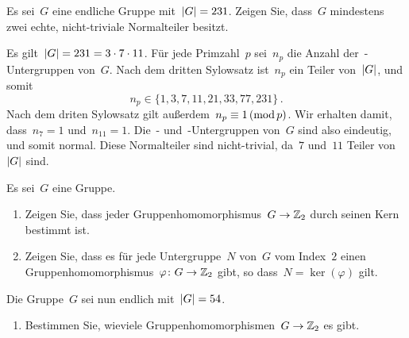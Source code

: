 \documentclass{scrartcl}
\begin{document}
\begin{exercise}
  Es sei~$G$ eine endliche Gruppe mit~$\lvert G\rvert = 231$.
  Zeigen Sie, dass~$G$ mindestens zwei echte, nicht-triviale Normalteiler besitzt.
\end{exercise}


\begin{solution}
  Es gilt~$\lvert G\rvert = 231 = 3 \cdot 7 \cdot 11$.
  Für jede Primzahl~$p$ sei~$n_p$ die Anzahl der~-Untergruppen von~$G$.
  Nach dem dritten Sylowsatz ist~$n_p$ ein Teiler von~$\lvert G\rvert$, und somit
  \[
    n_p \in \{ 1, 3, 7, 11, 21, 33, 77, 231 \} \,.
  \]
  Nach dem driten Sylowsatz gilt außerdem~$n_p \equiv 1 \,(\operatorname{mod} p)$.
  Wir erhalten damit, dass~$n_7 = 1$ und~$n_{11} = 1$.
  Die~- und~-Untergruppen von~$G$ sind also eindeutig, und somit normal.
  Diese Normalteiler sind nicht-trivial, da~$7$ und~$11$ Teiler von~$\lvert G\rvert$ sind.
\end{solution}

\begin{exercise}[subtitle = {Erstklausur 18/19}]
  Es sei~$G$ eine Gruppe.
  \begin{enumerate}
    \item
      Zeigen Sie, dass jeder Gruppenhomomorphismus~$G \to \Integer_2$ durch seinen Kern bestimmt ist.
    \item
      Zeigen Sie, dass es für jede Untergruppe~$N$ von~$G$ vom Index~$2$ einen Gruppenhomomorphismus~$\varphi \colon G \to \Integer_2$ gibt, so dass~$N = \ker(\varphi)$ gilt.
  \end{enumerate}
  Die Gruppe~$G$ sei nun endlich mit~$\lvert G\rvert = 54$.
  \begin{enumerate}[resume*]
    \item
      Bestimmen Sie, wieviele Gruppenhomomorphismen~$G \to \Integer_2$ es gibt.
  \end{enumerate}
\end{exercise}
\end{document}
